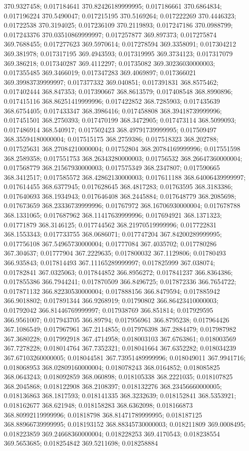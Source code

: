 370.9327458; 0.017184641 370.82426189999995; 0.017186661 370.6864834; 0.017196224 370.5490047; 0.017215195 370.5169264; 0.017222269 370.4446323; 0.01722538 370.3194025; 0.017236109 370.2119893; 0.017247186 370.0988799; 0.017243376 370.03510869999997; 0.017257877 369.897373; 0.017275874 369.7688455; 0.017277623 369.5970614; 0.017278594 369.3358091; 0.017304212 369.381978; 0.017317195 369.4943593; 0.017319995 369.3734123; 0.017317079 369.386218; 0.017340287 369.4112297; 0.01735082 369.30236030000003; 0.017355485 369.3466019; 0.017347283 369.4069897; 0.017366021 369.39983739999997; 0.017377332 369.040851; 0.017391831 368.8575462; 0.017402444 368.847353; 0.017390667 368.8613579; 0.017408548 368.8990896; 0.017415116 368.86251419999996; 0.017422852 368.7285903; 0.017435639 368.6754405; 0.017433347 368.3986416; 0.017458808 368.39418739999996; 0.017451501 368.2750393; 0.017470199 368.3472905; 0.017473114 368.5099093; 0.017486914 368.540917; 0.017502423 368.49791739999995; 0.017509497 368.35594180000004; 0.017515175 368.2759386; 0.017518323 368.202788; 0.017525631 368.27084210000004; 0.01752804 368.20784169999996; 0.017551598 368.2589358; 0.017551753 368.26343280000003; 0.01756532 368.26647360000004; 0.017568779 368.21567930000003; 0.017575349 368.2347807; 0.017590665 368.3412517; 0.017585572 368.42862130000003; 0.017611188 368.64006439999997; 0.017614455 368.6377945; 0.017628645 368.4817283; 0.01763595 368.3183386; 0.017640693 368.1934943; 0.017646408 368.2445884; 0.017648779 368.2085698; 0.017673659 368.23336739999996; 0.01767972 368.16706930000004; 0.017678788 368.1331065; 0.017687962 368.11417639999996; 0.017694921 368.1371323; 0.01771879 368.3146125; 0.017744562 368.21970519999996; 0.017722831 368.1553343; 0.017733755 368.0686071; 0.017747204 367.84200289999995; 0.017756108 367.54965730000004; 0.01777084 367.4035702; 0.017780286 367.304637; 0.01777904 367.2229635; 0.017800032 367.1129806; 0.01780493 366.935843; 0.017814493 367.11165289999997; 0.017825999 367.038074; 0.01782841 367.0325063; 0.017844852 366.8956272; 0.017841237 366.8364386; 0.017855386 366.7944241; 0.017870509 366.8496725; 0.017872336 366.7654722; 0.017871132 366.82230530000004; 0.017888156 366.8479594; 0.017885942 366.9018802; 0.017891344 366.9268919; 0.01790802 366.86423410000003; 0.01792042 366.81446769999997; 0.017938769 366.851814; 0.017929595 366.9561007; 0.017943705 366.89794; 0.017956961 366.8795238; 0.017964426 367.1086549; 0.017967961 367.2114855; 0.017976398 367.2884479; 0.017987982 367.3680228; 0.017992918 367.4714958; 0.018003103 367.6763861; 0.018003569 367.7278228; 0.018014764 367.7352321; 0.018041664 367.6352282; 0.018034239 367.67103260000005; 0.018044581 367.73951489999996; 0.018049011 367.9941716; 0.018068953 368.02809160000004; 0.018078243 368.0164852; 0.018085825 368.0643243; 0.018092859 368.060898; 0.018105338 368.2221035; 0.018107825 368.2045868; 0.018122908 368.2108397; 0.018132276 368.23456660000005; 0.018136863 368.1817593; 0.018141335 368.3232639; 0.018152841 368.5353921; 0.018162677 368.621948; 0.018158283 368.6362098; 0.018166873 368.80992119999996; 0.01818798 368.81471789999995; 0.018187125 368.88966739999995; 0.018193152 368.88345730000003; 0.018211809 369.0008495; 0.018223859 369.24668360000004; 0.018228253 369.4170543; 0.018238554 369.5653685; 0.018254842 369.5211698; 0.018258884 
